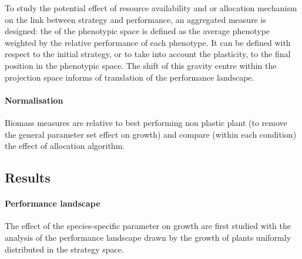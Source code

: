 To study the potential effect of resource availability and or allocation mechanism on the link between strategy and performance, an aggregated measure is designed: the  of the phenotypic space is defined as the average phenotype weighted by the relative performance of each phenotype. It can be defined with respect to the initial strategy, or to take into account the plasticity, to the final position in the phenotypic space. The shift of this gravity centre within the projection space informs of translation of the performance landscape.

\paragraph{Normalisation}

Biomass measures are relative to best performing non plastic plant (to remove the general parameter set effect on growth) and compare (within each condition) the effect of allocation algorithm. %


\subsection{Results}

\paragraph{Performance landscape}
The effect of the species-specific parameter on growth are first studied with the analysis of the performance landscape drawn by the growth of plants uniformly distributed in the strategy space.


